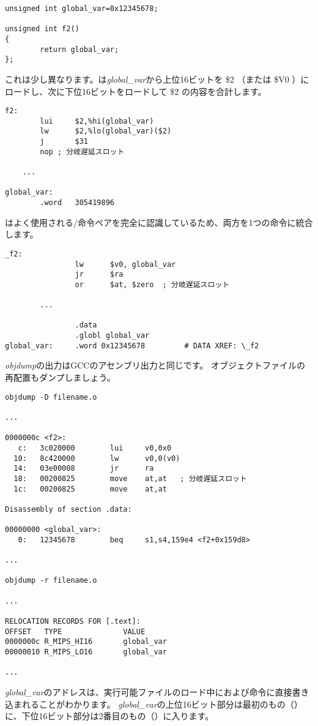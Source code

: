 \begin{lstlisting}[style=customc]
unsigned int global_var=0x12345678;

unsigned int f2()
{
        return global_var;
};
\end{lstlisting}


これは少し異なります。は\emph{global\_var}から上位16ビットを \$2 （または \$V0 ）にロードし、次に下位16ビットをロードして \$2 の内容を合計します。

\begin{lstlisting}[caption=GCC 4.4.5 -O3 (\assemblyOutput),style=customasmMIPS]
f2:
        lui     $2,%hi(global_var)
        lw      $2,%lo(global_var)($2)
        j       $31
        nop	; 分岐遅延スロット

	...

global_var:
        .word   305419896
\end{lstlisting}

\IDA はよく使用される/命令ペアを完全に認識しているため、両方を1つの命令に統合します。

\begin{lstlisting}[caption=GCC 4.4.5 -O3 (IDA),style=customasmMIPS]
_f2:
                lw      $v0, global_var
                jr      $ra
                or      $at, $zero	; 分岐遅延スロット

		...

                .data
                .globl global_var
global_var:     .word 0x12345678         # DATA XREF: \_f2
\end{lstlisting}

\emph{objdump}の出力はGCCのアセンブリ出力と同じです。 
オブジェクトファイルの再配置もダンプしましょう。

\begin{lstlisting}[caption=objdump,style=customasmMIPS]
objdump -D filename.o

...

0000000c <f2>:
   c:   3c020000        lui     v0,0x0
  10:   8c420000        lw      v0,0(v0)
  14:   03e00008        jr      ra
  18:   00200825        move    at,at	; 分岐遅延スロット
  1c:   00200825        move    at,at

Disassembly of section .data:

00000000 <global_var>:
   0:   12345678        beq     s1,s4,159e4 <f2+0x159d8>

...

objdump -r filename.o

...

RELOCATION RECORDS FOR [.text]:
OFFSET   TYPE              VALUE
0000000c R_MIPS_HI16       global_var
00000010 R_MIPS_LO16       global_var

...

\end{lstlisting}

\emph{global\_var}のアドレスは、実行可能ファイルのロード中におよび命令に直接書き込まれることがわかります。
\emph{global\_var}の上位16ビット部分は最初のもの（）に、下位16ビット部分は2番目のもの（）に入ります。
